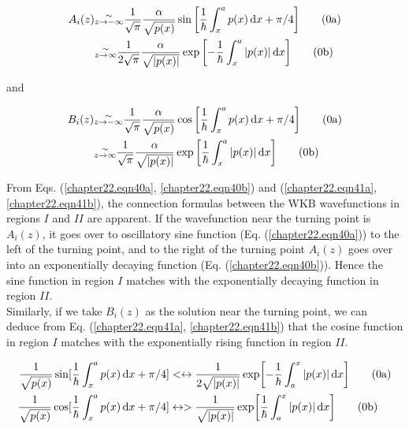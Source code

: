 \begin{align}
	A_i(z) 
	&\substack{\sim \\ z \rightarrow -\infty} \frac{1}{\sqrt{\pi}} \frac{\alpha}{\sqrt{p(x)}} \sin \qty[\frac{1}{\hbar} \int_{x}^{a} p(x) \dd{x} + \pi/4]
	\label{chapter22.eqn40a}
	\tag{\theequation a}
	 \\
	&\substack{\sim \\ z \rightarrow \infty} \frac{1}{2\sqrt{\pi}} \frac{\alpha}{\sqrt{\abs{p(x)}}} \exp \qty[-\frac{1}{\hbar} \int_{x}^{a} \abs{p(x)} \dd{x}]
	\label{chapter22.eqn40b}
	\tag{\theequation b}
\end{align}


and

\begin{align}
B_i(z) 
&\substack{\sim \\ z \rightarrow -\infty} \frac{1}{\sqrt{\pi}} \frac{\alpha}{\sqrt{p(x)}} \cos \qty[\frac{1}{\hbar} \int_{x}^{a} p(x) \dd{x} + \pi/4]
\label{chapter22.eqn41a}
\tag{\theequation a} \\
&\substack{\sim \\ z \rightarrow \infty} \frac{1}{\sqrt{\pi}} \frac{\alpha}{\sqrt{\abs{p(x)}}} \exp \qty[\frac{1}{\hbar} \int_{x}^{a} \abs{p(x)} \dd{x}]
\label{chapter22.eqn41b}
\tag{\theequation b}
\end{align}

From Eqs. (\ref{chapter22.eqn40a}, \ref{chapter22.eqn40b}) and (\ref{chapter22.eqn41a}, \ref{chapter22.eqn41b}), the connection formulas between the WKB wavefunctions in regions $I$ and $II$ are apparent. If the wavefunction near the turning point is $A_i(z)$, it goes over to oscillatory sine function (Eq. (\ref{chapter22.eqn40a})) to the left of the turning point, and to the right of the turning point $A_i(z)$
goes over into an exponentially decaying function (Eq. (\ref{chapter22.eqn40b})). Hence the sine function in region $I$ matches with the exponentially decaying function in region $II$.\\

Similarly, if we take $B_i(z)$ as the solution near the turning point, we can deduce from Eq. (\ref{chapter22.eqn41a}, \ref{chapter22.eqn41b}) that the cosine function in region $I$ matches with the exponentially rising function in region $II$.

\begin{align}
\frac{1}{\sqrt{p(x)}} \sin[\frac{1}{\hbar}\int_{x}^{a} p(x) \dd{x} + \pi/4] &<\leftrightarrow \frac{1}{2\sqrt{\abs{p(x)}}} \exp[-\frac{1}{\hbar}\int_{a}^{x} \abs{p(x)} \dd{x}]  \label{chapter22.eqn42a}
\tag{\theequation a} \\
\frac{1}{\sqrt{p(x)}} \cos[\frac{1}{\hbar}\int_{x}^{a} p(x) \dd{x} + \pi/4] &\leftrightarrow >
\frac{1}{\sqrt{\abs{p(x)}}} \exp[\frac{1}{\hbar}\int_{a}^{x} \abs{p(x)} \dd{x}]    \label{chapter22.eqn42b}
\tag{\theequation b} \\
\end{align}



